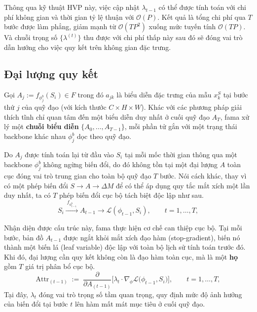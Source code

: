 Thông qua kỹ thuật HVP này, việc cập nhật $\lambda_{t-1}$ có thể được tính toán với chi phí không gian và thời gian tỷ lệ thuận với $\mathcal{O}(P)$. Kết quả là tổng chi phí qua $T$ bước được làm phẳng, giảm mạnh từ $\mathcal{O}(TP^2)$ xuống mức tuyến tính $\mathcal{O}(TP)$. Và chuỗi trọng số $\{\lambda^{(t)}\}$ thu được với chi phí thấp này sau đó sẽ đóng vai trò dẫn hướng cho việc quy kết trên không gian đặc trưng.

\subsection{Đại lượng quy kết}
\label{subsec:attribution_target}

Gọi $A_j := f_{\phi_j^{b}}(S_i) \in F$ trong đó $a_{jk}$ là biểu diễn đặc trưng của mẫu $x_k^S$ tại bước thứ $j$ của quỹ đạo (với kích thước $C \times H \times W$). Khác với các phương pháp giải thích tĩnh chỉ quan tâm đến một biểu diễn duy nhất ở cuối quỹ đạo $A_{T}$, \acrshort{fama} xử lý một \textbf{chuỗi biểu diễn} $\{A_0, \dots, A_{T-1}\}$, mỗi phần tử gắn với một trạng thái backbone khác nhau $\phi_j^{b}$ dọc theo quỹ đạo.

Do $A_j$ được tính toán lại từ đầu vào $S_i$ tại mỗi mốc thời gian thông qua một backbone $\phi_j^b$ không ngừng biến đổi, do đó không tồn tại một đại lượng $A$ toàn cục đóng vai trò trung gian cho toàn bộ quỹ đạo $T$ bước. Nói cách khác, thay vì có một phép biến đổi $S \to A \to \Delta M$ để có thể áp dụng quy tắc mắt xích một lần duy nhất, ta có $T$ phép biến đổi cục bộ tách biệt độc lập như sau. 
\begin{equation}
    S_i \xrightarrow{\ f_{\phi_{t-1}^{b}}\ } A_{t-1} \xrightarrow{\ } \mathcal{L}(\phi_{t-1}, S_i), \qquad t = 1, \dots, T,
    \label{eq:local_factorization}
\end{equation}

Nhận diện được cấu trúc này, \acrshort{fama} thực hiện cơ chế can thiệp cục bộ. Tại mỗi bước, bản đồ $A_{t-1}$ được ngắt khỏi mắt xích đạo hàm (stop-gradient), biến nó thành một biến lá (leaf variable) độc lập với toàn bộ lịch sử tính toán trước đó. Khi đó, đại lượng cần quy kết không còn là đạo hàm toàn cục, mà là một \textbf{họ} gồm $T$ giá trị phân bổ cục bộ.
\begin{equation}
    \mathrm{Attr}_{(t-1)} \;:=\; \frac{\partial}{\partial A_{(t-1)}}\Big[\lambda_t \cdot \nabla_{\phi} \mathcal{L}\big(\phi_{t-1}, S_i\big)\Big], \qquad t = 1,\dots,T,
    \label{eq:local_attr}
\end{equation}
Tại đây, $\lambda_t$ đóng vai trò trọng số tầm quan trọng, quy định mức độ ảnh hưởng của biến đổi tại bước $t$ lên hàm mất mát mục tiêu ở cuối quỹ đạo.
 
